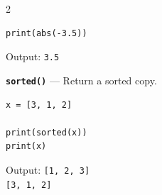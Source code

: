 \documentclass[10pt,a4paper]{article}
\begin{document}
\begin{multicols}{2}
\begin{card}
\begin{lstlisting}[style=pythonstyle]
print(abs(-3.5))
\end{lstlisting}

Output: \texttt{3.5}
\end{card}

\begin{card}
\textbf{\texttt{sorted()}} --- Return a sorted copy.

\begin{lstlisting}[style=pythonstyle]
x = [3, 1, 2]

print(sorted(x))
print(x)
\end{lstlisting}

Output:
\texttt{[1, 2, 3]}\\
\texttt{[3, 1, 2]}
\end{card}


\end{multicols}

\newpage
\end{document}
